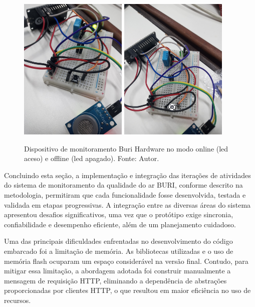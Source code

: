 \begin{figure}[ht]
    \centering
    \includegraphics[width=0.46\textwidth]{img/hardware-online.jpg}
    \includegraphics[width=0.46\textwidth]{img/hardware-offline.jpg}
    \caption{Dispositivo de monitoramento Buri Hardware no modo online (led aceso) e offline (led apagado). Fonte: Autor.}\label{figHardwareAoVivo}
\end{figure}

Concluindo esta seção, a implementação e integração das iterações de atividades do sistema de monitoramento da qualidade do ar BURI, conforme descrito na 
metodologia, permitiram que cada funcionalidade fosse desenvolvida, testada e validada em etapas progressivas. A integração entre as diversas áreas do sistema 
apresentou desafios significativos, uma vez que o protótipo exige sincronia, confiabilidade e desempenho eficiente, além de um planejamento cuidadoso.

Uma das principais dificuldades enfrentadas no desenvolvimento do código embarcado foi a limitação de memória. As bibliotecas 
utilizadas e o uso de memória flash ocuparam um espaço considerável na versão final. Contudo, para mitigar essa limitação, a abordagem adotada foi construir 
manualmente a mensagem de requisição HTTP, eliminando a dependência de abstrações proporcionadas por clientes HTTP, o que resultou em maior eficiência no uso de recursos.

